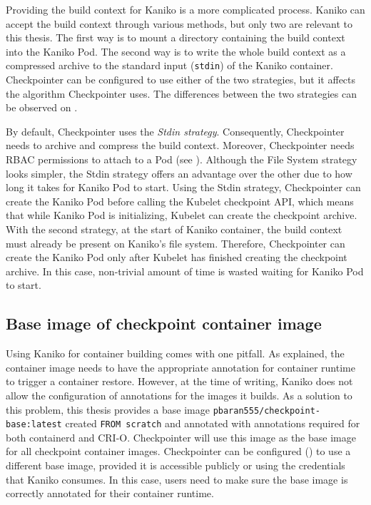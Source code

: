 \documentclass[
  digital,     %
  oneside,     %
  nosansbold,  %
  nocolorbold, %
  lof,         %
  nolot,         %
]{fithesis4}
\begin{document}
Providing the build context for Kaniko is a more complicated process. Kaniko can accept the build context through various methods, but only two are relevant to this thesis. The first way is to mount a directory containing the build context into the Kaniko Pod. The second way is to write the whole build context as a compressed archive to the standard input (\texttt{stdin}) of the Kaniko container. Checkpointer can be configured to use either of the two strategies, but it affects the algorithm Checkpointer uses. The differences between the two strategies can be observed on .


By default, Checkpointer uses the \emph{Stdin strategy}. Consequently, Checkpointer needs to archive and compress the build context. Moreover, Checkpointer needs RBAC permissions to attach to a Pod (see ). Although the File System strategy looks simpler, the Stdin strategy offers an advantage over the other due to how long it takes for Kaniko Pod to start. Using the Stdin strategy, Checkpointer can create the Kaniko Pod before calling the Kubelet checkpoint API, which means that while Kaniko Pod is initializing, Kubelet can create the checkpoint archive. With the second strategy, at the start of Kaniko container, the build context must already be present on Kaniko's file system. Therefore, Checkpointer can create the Kaniko Pod only after Kubelet has finished creating the checkpoint archive. In this case, non-trivial amount of time is wasted waiting for Kaniko Pod to start.

\subsection{Base image of checkpoint container image}
\label{sec:base-image}
Using Kaniko for container building comes with one pitfall. As  explained, the container image needs to have the appropriate annotation for container runtime to trigger a container restore. However, at the time of writing, Kaniko does not allow the configuration of annotations for the images it builds. As a solution to this problem, this thesis provides a base image \texttt{pbaran555/checkpoint-base:latest} created \texttt{FROM scratch} and annotated with annotations required for both containerd and CRI-O. Checkpointer will use this image as the base image for all checkpoint container images. Checkpointer can be configured () to use a different base image, provided it is accessible publicly or using the credentials that Kaniko consumes. In this case, users need to make sure the base image is correctly annotated for their container runtime.
\end{document}
